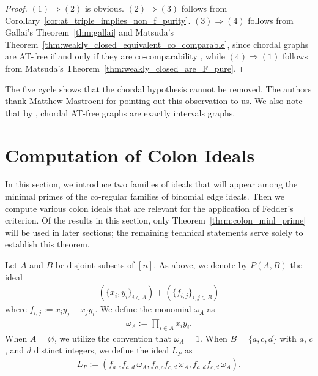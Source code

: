 \documentclass[12pt,a4paper]{amsart}
\theoremstyle{plain}
\theoremstyle{definition}
\theoremstyle{remark}
\begin{document}
\begin{proof}
    $\mathit{(1) \Rightarrow (2)}$ is obvious.  $\mathit{(2) \Rightarrow (3)}$ follows from Corollary~\ref{cor:at_triple_implies_non_f_purity}.  $\mathit{(3) \Rightarrow (4)}$ follows from Gallai's Theorem~\ref{thm:gallai} and Matsuda's Theorem~\ref{thm:weakly_closed_equivalent_co_comparable}, since chordal graphs are AT-free if and only if they are co-comparability \cite{isgciATFreeANDChordal}, while $\mathit{(4) \Rightarrow (1)}$ follows from Matsuda's Theorem~\ref{thm:weakly_closed_are_F_pure}.
\end{proof}

The five cycle shows that the chordal hypothesis cannot be removed.  The authors thank Matthew Mastroeni for pointing out this observation to us.  We also note that by \cite[Theorem 3]{LB62}, chordal AT-free graphs are exactly intervals graphs.

\section{Computation of Colon Ideals}
\label{sec:computation_colon_ideals}

In this section, we introduce two families of ideals that will appear among the minimal primes of the co-regular families of binomial edge ideals. Then we compute various colon ideals that are relevant for the application of Fedder's criterion. Of the results in this section, only Theorem~\ref{thrm:colon_minl_prime} will be used in later sections; the remaining technical statements serve solely to establish this theorem.

\nota 
Let $A$ and $B$ be disjoint subsets of $[n]$. As above, we denote by $P(A,B)$ the ideal
\begin{align*}
(\{x_{i},y_{i}\}_{i\in A}) + ( \{f_{i,j} \}_{i,j \in B} )
\end{align*}
where $f_{i,j} := x_{i}y_{j} - x_{j}y_{i}$. We define the monomial $\omega_{A}$ as 
\begin{align*}
\omega_{A} := \prod_{i \in A} x_{i} y_{i}.
\end{align*}
When $A = \varnothing$, we utilize the convention that $\omega_{A} = 1$. When $B = \{a,c,d\}$ with $a$, $c$, and $d$ distinct integers, we define the ideal $L_{P}$ as
\begin{align*}
    L_{P} := (f_{a,c}f_{a,d}\, \omega_{A},f_{a,c}f_{c,d}\, \omega_{A},f_{a,d}f_{c,d} \, \omega_{A}).
\end{align*}
\end{document}
